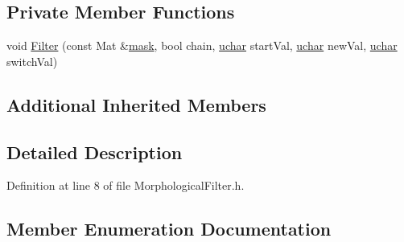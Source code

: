 \subsection*{Private Member Functions}
\begin{DoxyCompactItemize}
\item 
void \hyperlink{class_vision_1_1_morphological_filter_ab743062372a8d0b26dabfd27451e72ed}{Filter} (const Mat \&\hyperlink{_gen_blob_8m_a2f6787d513f2bdbca6833c1c1ee04329}{mask}, bool chain, \hyperlink{_soil_math_types_8h_a65f85814a8290f9797005d3b28e7e5fc}{uchar} start\+Val, \hyperlink{_soil_math_types_8h_a65f85814a8290f9797005d3b28e7e5fc}{uchar} new\+Val, \hyperlink{_soil_math_types_8h_a65f85814a8290f9797005d3b28e7e5fc}{uchar} switch\+Val)
\end{DoxyCompactItemize}
\subsection*{Additional Inherited Members}


\subsection{Detailed Description}


Definition at line 8 of file Morphological\+Filter.\+h.



\subsection{Member Enumeration Documentation}
\hypertarget{class_vision_1_1_morphological_filter_a1f19c9cb13f0d68778c77d6fd0370868}{}
